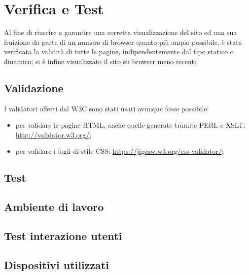 \section{Verifica e Test}{
	Al fine di riuscire a garantire una corretta visualizzazione del sito ed una sua fruizione da parte di un numero di browser quanto più ampio possibile, è stata verificata la validità di tutte le pagine, indipendentemente dal tipo statico o dinamico; si è infine visualizzato il sito su browser meno recenti.
	\subsection{Validazione}{
		I validatori offerti dal W3C sono stati usati ovunque fosse possibile:
		\begin{itemize}\itemsep1pt
			\item per validare le pagine HTML, anche quelle generate tramite PERL e XSLT: \url{http://validator.w3.org/};
			\item per validare i fogli di stile CSS: \url{https://jigsaw.w3.org/css-validator/};
		\end{itemize}
	}
	\subsection{Test}{
		
	}
	\subsection{Ambiente di lavoro}
	\subsection{Test interazione utenti}
	\subsection{Dispositivi utilizzati}
}
